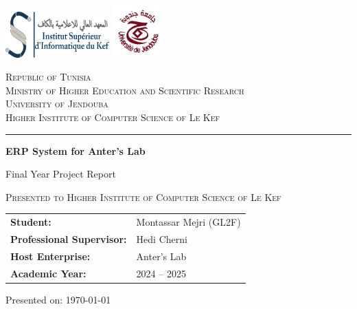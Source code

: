 \documentclass[12pt,a4paper]{report}
\begin{document}
\begin{titlepage}
  \centering
  
  \includegraphics[width=0.3\textwidth]{isikef.png}\hfill
  \includegraphics[width=0.15\textwidth]{jendouba.png}
  
  \vspace{1.5cm}
  
  {\scshape\large Republic of Tunisia\\
  Ministry of Higher Education and Scientific Research\\
  University of Jendouba\\
  Higher Institute of Computer Science of Le Kef\par}
  
  \vspace{1.5cm}
  
  \noindent\rule{\textwidth}{0.5pt}
  
  \vspace{2cm}
  
  {\Huge\bfseries ERP System for Anter's Lab\par}
  \vspace{1cm}
  {\Large Final Year Project Report\par}
  \vspace{1cm}
  {\scshape\large Presented to Higher Institute of Computer Science of Le Kef\par}
  \vspace{1.5cm}
  
  \begin{tabular}{@{}>{\bfseries}l l@{}}
    Student: & Montassar Mejri (GL2F) \\
    Professional Supervisor: & Hedi Cherni \\
    Host Enterprise: & Anter's Lab \\
    Academic Year: & 2024 -- 2025 \\
  \end{tabular}
  
  \vspace*{\fill}
  {\large Presented on: \today}
\end{titlepage}
\end{document}
